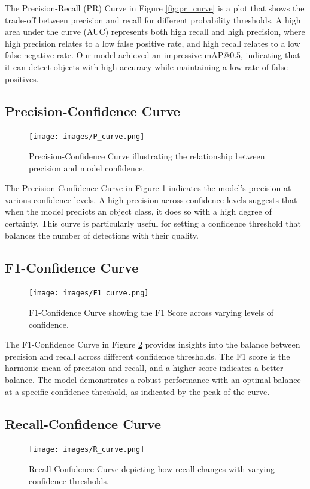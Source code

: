 \documentclass[10pt]{extarticle}
\begin{document}
The Precision-Recall (PR) Curve in Figure \ref{fig:pr_curve} is a plot that shows the trade-off between precision and recall for different probability thresholds. A high area under the curve (AUC) represents both high recall and high precision, where high precision relates to a low false positive rate, and high recall relates to a low false negative rate. Our model achieved an impressive mAP@0.5, indicating that it can detect objects with high accuracy while maintaining a low rate of false positives.

\subsection{Precision-Confidence Curve}
\begin{figure}[H]
\centering
\texttt{[image: images/P\_curve.png]}
\caption{Precision-Confidence Curve illustrating the relationship between precision and model confidence.}
\label{fig:p_curve}
\end{figure}

The Precision-Confidence Curve in Figure \ref{fig:p_curve} indicates the model's precision at various confidence levels. A high precision across confidence levels suggests that when the model predicts an object class, it does so with a high degree of certainty. This curve is particularly useful for setting a confidence threshold that balances the number of detections with their quality.

\subsection{F1-Confidence Curve}

\begin{figure}[H]
    \centering
    \texttt{[image: images/F1\_curve.png]}
    \caption{F1-Confidence Curve showing the F1 Score across varying levels of confidence.}
    \label{fig:f1_curve}
    \end{figure}

The F1-Confidence Curve in Figure \ref{fig:f1_curve} provides insights into the balance between precision and recall across different confidence thresholds. The F1 score is the harmonic mean of precision and recall, and a higher score indicates a better balance. The model demonstrates a robust performance with an optimal balance at a specific confidence threshold, as indicated by the peak of the curve.

\subsection{Recall-Confidence Curve}
\begin{figure}[H]
    \centering
    \texttt{[image: images/R\_curve.png]}
    \caption{Recall-Confidence Curve depicting how recall changes with varying confidence thresholds.}
    \label{fig:r_curve}
    \end{figure}
\end{document}
